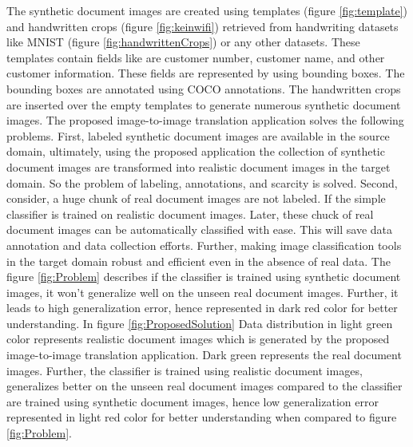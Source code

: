 The synthetic document images are created using templates (figure \ref{fig:template}) and handwritten crops (figure \ref{fig:keinwifi}) retrieved from handwriting datasets like \ac{MNIST} (figure \ref{fig:handwrittenCrops}) or any other datasets. These templates contain fields like are customer number, customer name, and other customer information. These fields are represented by using bounding boxes. The bounding boxes are annotated using \ac{COCO} annotations\cite{10.1007/978-3-319-10602-1_48}. The handwritten crops are inserted over the empty templates to generate numerous synthetic document images. The proposed image-to-image translation application solves the following problems. First, labeled synthetic document images are available in the source domain, ultimately, using the proposed application the collection of synthetic document images are transformed into realistic document images in the target domain. So the problem of labeling, annotations, and scarcity is solved. Second, consider, a huge chunk of real document images are not labeled. If the simple classifier is trained on realistic document images. Later, these chuck of real document images can be automatically classified with ease. This will save data annotation and data collection efforts. Further, making image classification tools in the target domain robust and efficient even in the absence of real data. The figure \ref{fig:Problem} describes if the classifier is trained using synthetic document images, it won't generalize well on the unseen real document images. Further, it leads to high generalization error, hence represented in dark red color for better understanding. In figure \ref{fig:ProposedSolution} Data distribution in light green color represents realistic document images which is generated by the proposed image-to-image translation application. Dark green represents the real document images.  Further, the classifier is trained using realistic document images, generalizes better on the unseen real document images compared to the classifier are trained using synthetic document images, hence low generalization error represented in light red color for better understanding when compared to figure \ref{fig:Problem}.



